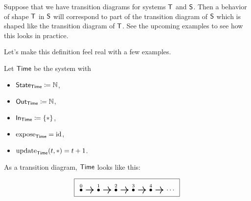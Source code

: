\documentclass[DynamicalBook]{subfiles}
\begin{document}
{\begin{remark}
  Suppose that we have transition diagrams for systems $\mathsf{T}$ and $\mathsf{S}$.
  Then a behavior of shape $\mathsf{T}$ in $\mathsf{S}$ will correspond to part of the
  transition diagram of $\mathsf{S}$ which is shaped like the transition diagram of
  $\mathsf{T}$. See the upcoming examples to see how this looks in practice.
\end{remark}

 Let's make this definition feel real with a few examples.

\begin{example}\label{ex.trajectory_as_behavior_discrete}
  Let $\mathsf{Time}$ be the system with
\begin{itemize}
\item $\mathsf{State}_{\mathsf{Time}} \coloneqq \mathbb{N}$,
\item $\mathsf{Out}_{\mathsf{Time}} \coloneqq \mathbb{N}$,
\item $\mathsf{In}_{\mathsf{Time}} \coloneqq \{\ast\}$,
\item $\mathrm{expose}_{\mathsf{Time}} = \mathrm{id}$,
\item $\mathrm{update}_{\mathsf{Time}}(t, \ast) = t + 1$.
\end{itemize}

As a transition diagram, $\mathsf{Time}$ looks like this:

\[
\begin{tikzpicture}
	\node[draw] {
  \begin{tikzcd}[column sep=small]
    \LMO{0} \ar[r, thick] & \LMO{1} \ar[r,  thick] & \LMO{2} \ar[r, thick] & \LMO{3} \ar[r, thick] & \LMO{4} \ar[r, thick] & \cdots
  \end{tikzcd}
  };
\end{tikzpicture}
\]


\end{example}}
\end{document}
